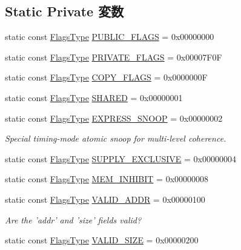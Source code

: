 \subsection*{Static Private 変数}
\begin{DoxyCompactItemize}
\item 
static const \hyperlink{classPacket_a2da503161d95c65aea559dbabcf570aa}{FlagsType} \hyperlink{classPacket_aedf1d129016ac677627a1e3c2ee6b59a}{PUBLIC\_\-FLAGS} = 0x00000000
\item 
static const \hyperlink{classPacket_a2da503161d95c65aea559dbabcf570aa}{FlagsType} \hyperlink{classPacket_aa377b218207b557079f48b02e7acf167}{PRIVATE\_\-FLAGS} = 0x00007F0F
\item 
static const \hyperlink{classPacket_a2da503161d95c65aea559dbabcf570aa}{FlagsType} \hyperlink{classPacket_af494771dbda61056aaad3f6ad7e2d84d}{COPY\_\-FLAGS} = 0x0000000F
\item 
static const \hyperlink{classPacket_a2da503161d95c65aea559dbabcf570aa}{FlagsType} \hyperlink{classPacket_a3f87955b81ea6f9d7f89d5ab033074f9}{SHARED} = 0x00000001
\item 
static const \hyperlink{classPacket_a2da503161d95c65aea559dbabcf570aa}{FlagsType} \hyperlink{classPacket_a0b5a042e640242aeaeeebef73a69df26}{EXPRESS\_\-SNOOP} = 0x00000002
\begin{DoxyCompactList}\small\item\em Special timing-\/mode atomic snoop for multi-\/level coherence. \item\end{DoxyCompactList}\item 
static const \hyperlink{classPacket_a2da503161d95c65aea559dbabcf570aa}{FlagsType} \hyperlink{classPacket_a064f460e5a6ed3522adc424c5d31646a}{SUPPLY\_\-EXCLUSIVE} = 0x00000004
\item 
static const \hyperlink{classPacket_a2da503161d95c65aea559dbabcf570aa}{FlagsType} \hyperlink{classPacket_aae6e80e571cf0888e7583aa556c3f171}{MEM\_\-INHIBIT} = 0x00000008
\item 
static const \hyperlink{classPacket_a2da503161d95c65aea559dbabcf570aa}{FlagsType} \hyperlink{classPacket_ac99ea8fdca503270882373e7a801a2b6}{VALID\_\-ADDR} = 0x00000100
\begin{DoxyCompactList}\small\item\em Are the 'addr' and 'size' fields valid? \item\end{DoxyCompactList}\item 
static const \hyperlink{classPacket_a2da503161d95c65aea559dbabcf570aa}{FlagsType} \hyperlink{classPacket_a3e2067968b47a2acb352b48bced164cf}{VALID\_\-SIZE} = 0x00000200

\end{DoxyCompactItemize}
